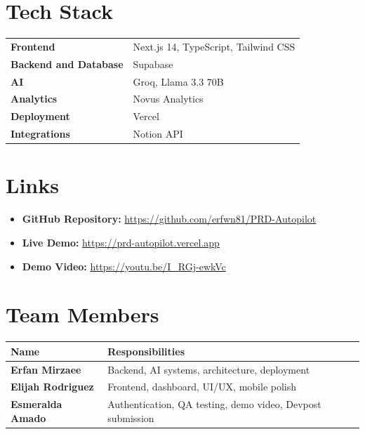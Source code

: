 \documentclass[11pt]{article}
\begin{document}
\section{Tech Stack}

\begin{tcolorbox}[
    colback=light,
    colframe=primary,
    arc=3mm,
    boxrule=0.8pt
]
\begin{tabular}{>{\bfseries}p{4cm} p{10cm}}
Frontend & Next.js 14, TypeScript, Tailwind CSS \\
Backend and Database & Supabase \\
AI & Groq, Llama 3.3 70B \\
Analytics & Novus Analytics \\
Deployment & Vercel \\
Integrations & Notion API \\
\end{tabular}
\end{tcolorbox}

\section{Links}

\begin{itemize}
    \item \textbf{GitHub Repository:} \href{https://github.com/erfwn81/PRD-Autopilot}{https://github.com/erfwn81/PRD-Autopilot}
    \item \textbf{Live Demo:} \href{https://prd-autopilot.vercel.app}{https://prd-autopilot.vercel.app}
    \item \textbf{Demo Video:} \href{https://youtu.be/I_RGj-ewkVc}{https://youtu.be/I_RGj-ewkVc}
\end{itemize}

\section{Team Members}

\begin{center}
\begin{tabular}{|>{\bfseries}p{4cm}|p{9cm}|}
\hline
Name & Responsibilities \\
\hline
Erfan Mirzaee & Backend, AI systems, architecture, deployment \\
\hline
Elijah Rodriguez & Frontend, dashboard, UI/UX, mobile polish \\
\hline
Esmeralda Amado & Authentication, QA testing, demo video, Devpost submission \\
\hline
\end{tabular}
\end{center}
\end{document}
